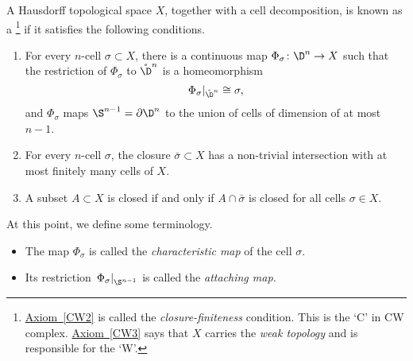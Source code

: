 \documentclass[main.tex]{subfiles}
\begin{document}
\begin{definition}[CW complex]
  \label{def:cw_complex}
  A Hausdorff topological space $X$, together with a cell decomposition, is known as a \footnote{\hyperref[CW2]{Axiom~\ref*{CW2}} is called the \emph{closure-finiteness} condition. This is the `C' in CW complex. \hyperref[CW3]{Axiom~\ref*{CW3}} says that $X$ carries the \emph{weak topology} and is responsible for the `W'.} if it satisfies the following conditions.
  \begin{enumerate}[label=(CW\arabic*), leftmargin=*]
    \item \label{CW1} For every $n$-cell $\sigma \subset X$, there is a continuous map $\Phi_{\sigma}\colon \D^{n} \to X$ such that the restriction of $\Phi_{\sigma}$ to $\mathring{\D}^{n}$ is a homeomorphism
      \begin{equation*}
        \left. \Phi_{\sigma} \right|_{\mathring{\D}^{n}} \cong \sigma,
      \end{equation*}
      and $\Phi_{\sigma}$ maps $\S^{n-1} = \partial \D^{n}$ to the union of cells of dimension of at most $n-1$.

    \item \label{CW2} For every $n$-cell $\sigma$, the closure $\bar{\sigma} \subset X$ has a non-trivial intersection with at most finitely many cells of $X$.

    \item \label{CW3} A subset $A \subset X$ is closed if and only if $A \cap \bar{\sigma}$ is closed for all cells $\sigma \in X$.
  \end{enumerate}
\end{definition}

At this point, we define some terminology.
\begin{itemize}
  \item The map $\Phi_{\sigma}$ is called the \emph{characteristic map} of the cell $\sigma$.

  \item Its restriction $\left. \Phi_{\sigma} \right|_{\S^{n-1}}$ is called the \emph{attaching map.}
\end{itemize}
\end{document}
